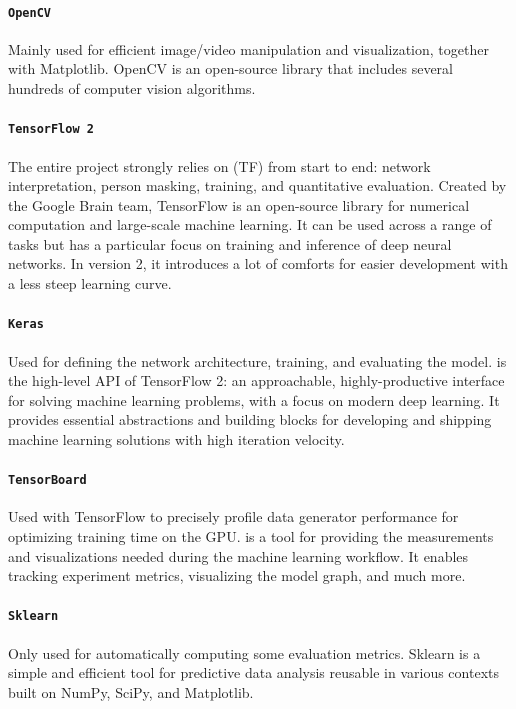 \paragraph*{\texttt{OpenCV}}
Mainly used for efficient image/video manipulation and visualization, together with Matplotlib. OpenCV is an open-source library that includes several hundreds of computer vision algorithms.

\paragraph*{\texttt{TensorFlow 2}}
The entire project strongly relies on \cite{tensorflow} (TF) from start to end: network interpretation, person masking, training, and quantitative evaluation. Created by the Google Brain team, TensorFlow is an open-source library for numerical computation and large-scale machine learning. It can be used across a range of tasks but has a particular focus on training and inference of deep neural networks. In version 2, it introduces a lot of comforts for easier development with a less steep learning curve.

\paragraph*{\texttt{Keras}}
Used for defining the network architecture, training, and evaluating the model. \cite{keras} is the high-level API of TensorFlow 2: an approachable, highly-productive interface for solving machine learning problems, with a focus on modern deep learning. It provides essential abstractions and building blocks for developing and shipping machine learning solutions with high iteration velocity.

\paragraph*{\texttt{TensorBoard}}
Used with TensorFlow to precisely profile data generator performance for optimizing training time on the GPU. \cite{tensorBoard} is a tool for providing the measurements and visualizations needed during the machine learning workflow. It enables tracking experiment metrics, visualizing the model graph, and much more.

\paragraph*{\texttt{Sklearn}}
Only used for automatically computing some evaluation metrics. Sklearn is a simple and efficient tool for predictive data analysis reusable in various contexts built on NumPy, SciPy, and Matplotlib.

